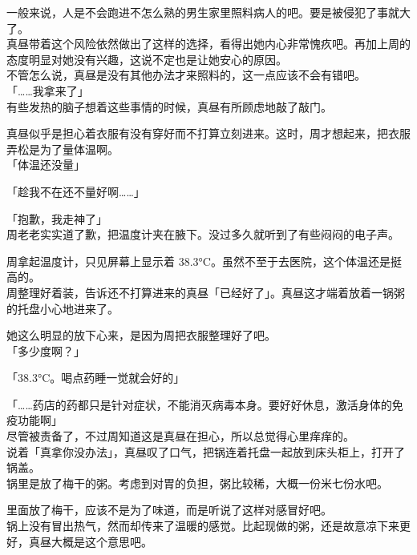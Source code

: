 一般来说，人是不会跑进不怎么熟的男生家里照料病人的吧。要是被侵犯了事就大了。\\

真昼带着这个风险依然做出了这样的选择，看得出她内心非常愧疚吧。再加上周的态度明显对她没有兴趣，这说不定也是让她安心的原因。\\

不管怎么说，真昼是没有其他办法才来照料的，这一点应该不会有错吧。\\

「……我拿来了」\\

有些发热的脑子想着这些事情的时候，真昼有所顾虑地敲了敲门。

真昼似乎是担心着衣服有没有穿好而不打算立刻进来。这时，周才想起来，把衣服弄松是为了量体温啊。\\

「体温还没量」

「趁我不在还不量好啊……」

「抱歉，我走神了」\\

周老老实实道了歉，把温度计夹在腋下。没过多久就听到了有些闷闷的电子声。

周拿起温度计，只见屏幕上显示着 38.3°C。虽然不至于去医院，这个体温还是挺高的。\\

周整理好着装，告诉还不打算进来的真昼「已经好了」。真昼这才端着放着一锅粥的托盘小心地进来了。

她这么明显的放下心来，是因为周把衣服整理好了吧。\\

「多少度啊？」

「38.3°C。喝点药睡一觉就会好的」

「……药店的药都只是针对症状，不能消灭病毒本身。要好好休息，激活身体的免疫功能啊」\\

尽管被责备了，不过周知道这是真昼在担心，所以总觉得心里痒痒的。\\

说着「真拿你没办法」，真昼叹了口气，把锅连着托盘一起放到床头柜上，打开了锅盖。\\

锅里是放了梅干的粥。考虑到对胃的负担，粥比较稀，大概一份米七份水吧。

里面放了梅干，应该不是为了味道，而是听说了这样对感冒好吧。\\

锅上没有冒出热气，然而却传来了温暖的感觉。比起现做的粥，还是故意凉下来更好，真昼大概是这个意思吧。\\


